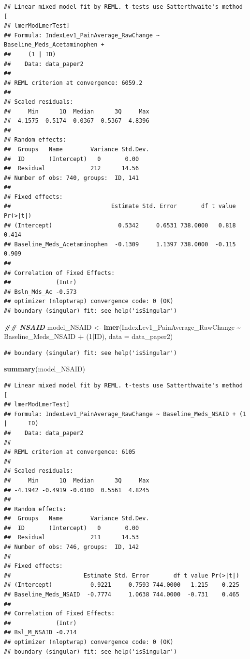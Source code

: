 \documentclass[
  12pt,
]{article}
\newenvironment{Shaded}{\begin{snugshade}}{\end{snugshade}}
\newcommand{\AttributeTok}[1]{\textcolor[rgb]{0.13,0.29,0.53}{#1}}
\newcommand{\DecValTok}[1]{\textcolor[rgb]{0.00,0.00,0.81}{#1}}
\newcommand{\DocumentationTok}[1]{\textcolor[rgb]{0.56,0.35,0.01}{\textbf{\textit{#1}}}}
\newcommand{\FunctionTok}[1]{\textcolor[rgb]{0.13,0.29,0.53}{\textbf{#1}}}
\newcommand{\NormalTok}[1]{#1}
\newcommand{\OtherTok}[1]{\textcolor[rgb]{0.56,0.35,0.01}{#1}}
\newcommand{\SpecialCharTok}[1]{\textcolor[rgb]{0.81,0.36,0.00}{\textbf{#1}}}
\begin{document}
\begin{verbatim}
## Linear mixed model fit by REML. t-tests use Satterthwaite's method [
## lmerModLmerTest]
## Formula: IndexLev1_PainAverage_RawChange ~ Baseline_Meds_Acetaminophen +  
##     (1 | ID)
##    Data: data_paper2
## 
## REML criterion at convergence: 6059.2
## 
## Scaled residuals: 
##     Min      1Q  Median      3Q     Max 
## -4.1575 -0.5174 -0.0367  0.5367  4.8396 
## 
## Random effects:
##  Groups   Name        Variance Std.Dev.
##  ID       (Intercept)   0       0.00   
##  Residual             212      14.56   
## Number of obs: 740, groups:  ID, 141
## 
## Fixed effects:
##                             Estimate Std. Error       df t value Pr(>|t|)
## (Intercept)                   0.5342     0.6531 738.0000   0.818    0.414
## Baseline_Meds_Acetaminophen  -0.1309     1.1397 738.0000  -0.115    0.909
## 
## Correlation of Fixed Effects:
##             (Intr)
## Bsln_Mds_Ac -0.573
## optimizer (nloptwrap) convergence code: 0 (OK)
## boundary (singular) fit: see help('isSingular')
\end{verbatim}

\begin{Shaded}
\begin{Highlighting}[]
\DocumentationTok{\#\# NSAID}
\NormalTok{model\_NSAID }\OtherTok{\textless{}{-}} \FunctionTok{lmer}\NormalTok{(IndexLev1\_PainAverage\_RawChange }\SpecialCharTok{\textasciitilde{}}\NormalTok{ Baseline\_Meds\_NSAID }\SpecialCharTok{+}\NormalTok{ (}\DecValTok{1}\SpecialCharTok{|}\NormalTok{ID), }\AttributeTok{data =}\NormalTok{ data\_paper2)}
\end{Highlighting}
\end{Shaded}

\begin{verbatim}
## boundary (singular) fit: see help('isSingular')
\end{verbatim}

\begin{Shaded}
\begin{Highlighting}[]
\FunctionTok{summary}\NormalTok{(model\_NSAID)}
\end{Highlighting}
\end{Shaded}

\begin{verbatim}
## Linear mixed model fit by REML. t-tests use Satterthwaite's method [
## lmerModLmerTest]
## Formula: IndexLev1_PainAverage_RawChange ~ Baseline_Meds_NSAID + (1 |      ID)
##    Data: data_paper2
## 
## REML criterion at convergence: 6105
## 
## Scaled residuals: 
##     Min      1Q  Median      3Q     Max 
## -4.1942 -0.4919 -0.0100  0.5561  4.8245 
## 
## Random effects:
##  Groups   Name        Variance Std.Dev.
##  ID       (Intercept)   0       0.00   
##  Residual             211      14.53   
## Number of obs: 746, groups:  ID, 142
## 
## Fixed effects:
##                     Estimate Std. Error       df t value Pr(>|t|)
## (Intercept)           0.9221     0.7593 744.0000   1.215    0.225
## Baseline_Meds_NSAID  -0.7774     1.0638 744.0000  -0.731    0.465
## 
## Correlation of Fixed Effects:
##             (Intr)
## Bsl_M_NSAID -0.714
## optimizer (nloptwrap) convergence code: 0 (OK)
## boundary (singular) fit: see help('isSingular')
\end{verbatim}
\end{document}

